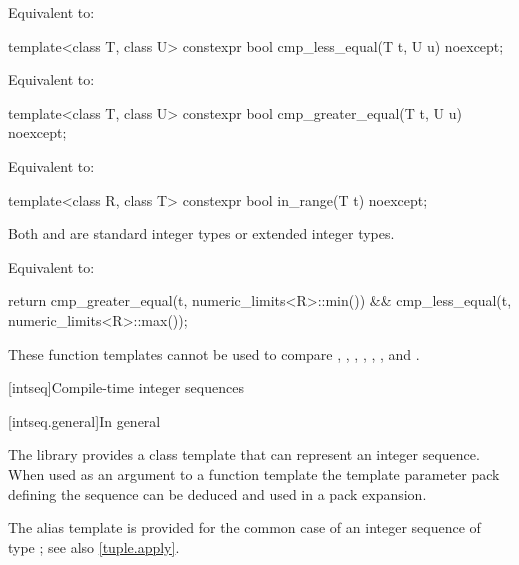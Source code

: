 \begin{itemdescr}
\pnum
\effects
Equivalent to: 
\end{itemdescr}

%
\begin{itemdecl}
template<class T, class U>
  constexpr bool cmp_less_equal(T t, U u) noexcept;
\end{itemdecl}

\begin{itemdescr}
\pnum
\effects
Equivalent to: 
\end{itemdescr}

%
\begin{itemdecl}
template<class T, class U>
  constexpr bool cmp_greater_equal(T t, U u) noexcept;
\end{itemdecl}

\begin{itemdescr}
\pnum
\effects
Equivalent to: 
\end{itemdescr}

%
\begin{itemdecl}
template<class R, class T>
  constexpr bool in_range(T t) noexcept;
\end{itemdecl}

\begin{itemdescr}
\pnum
\mandates
Both  and  are standard integer types or
extended integer types.

\pnum
\effects
Equivalent to:
\begin{codeblock}
return cmp_greater_equal(t, numeric_limits<R>::min()) &&
       cmp_less_equal(t, numeric_limits<R>::max());
\end{codeblock}
\end{itemdescr}

\pnum
\begin{note}
These function templates cannot be used to compare
,
,
,
,
,
, and
.
\end{note}

[intseq]{Compile-time integer sequences}

[intseq.general]{In general}

\pnum
The library provides a class template that can represent an integer sequence.
When used as an argument to a function template the template parameter pack defining the
sequence can be deduced and used in a pack expansion.
\begin{note}
The  alias template is provided for the common case of
an integer sequence of type ; see also \ref{tuple.apply}.
\end{note}


